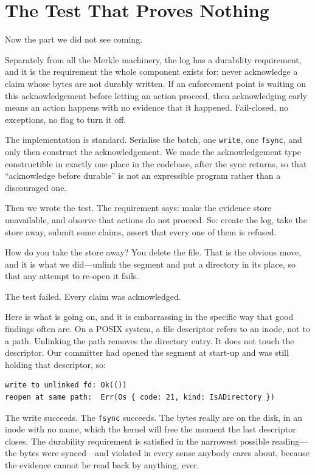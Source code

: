 \documentclass[11pt]{article}
\begin{document}
\section{The Test That Proves Nothing}
\label{sec:test}

Now the part we did not see coming.

Separately from all the Merkle machinery, the log has a durability
requirement, and it is the requirement the whole component exists for: never
acknowledge a claim whose bytes are not durably written. If an enforcement
point is waiting on this acknowledgement before letting an action proceed,
then acknowledging early means an action happens with no evidence that it
happened. Fail-closed, no exceptions, no flag to turn it off.

The implementation is standard. Serialise the batch, one \texttt{write}, one
\texttt{fsync}, and only then construct the acknowledgement. We made the
acknowledgement type constructible in exactly one place in the codebase, after
the sync returns, so that ``acknowledge before durable'' is not an expressible
program rather than a discouraged one.

Then we wrote the test. The requirement says: make the evidence store
unavailable, and observe that actions do not proceed. So: create the log, take
the store away, submit some claims, assert that every one of them is refused.

How do you take the store away? You delete the file. That is the obvious move,
and it is what we did---unlink the segment and put a directory in its place, so
that any attempt to re-open it fails.

The test failed. Every claim was acknowledged.

Here is what is going on, and it is embarrassing in the specific way that good
findings often are. On a POSIX system, a file descriptor refers to an inode,
not to a path. Unlinking the path removes the directory entry. It does not
touch the descriptor. Our committer had opened the segment at start-up and was
still holding that descriptor, so:

\begin{lstlisting}
write to unlinked fd: Ok(())
reopen at same path:  Err(Os { code: 21, kind: IsADirectory })
\end{lstlisting}

The write succeeds. The \texttt{fsync} succeeds. The bytes really are on the
disk, in an inode with no name, which the kernel will free the moment the last
descriptor closes. The durability requirement is satisfied in the narrowest
possible reading---the bytes were synced---and violated in every sense anybody
cares about, because the evidence cannot be read back by anything, ever.
\end{document}
